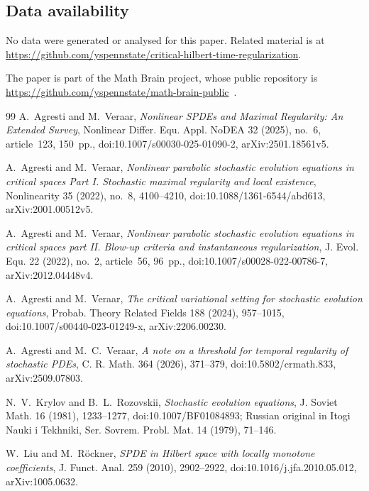 \documentclass[11pt]{amsart}
\theoremstyle{definition}
\theoremstyle{remark}
\numberwithin{equation}{section}
\begin{document}
\begin{samepage}
\section*{Data availability}
No data were generated or analysed for this paper. Related material is at
\url{https://github.com/yspennstate/critical-hilbert-time-regularization}.

The paper is part of the Math Brain project, whose public repository is \url{https://github.com/yspennstate/math-brain-public}~\cite{MathBrainRepo}.
\end{samepage}

\begin{thebibliography}{99}
 A.~Agresti and M.~Veraar,
\emph{Nonlinear SPDEs and Maximal Regularity: An Extended Survey},
Nonlinear Differ. Equ. Appl. NoDEA 32 (2025), no.~6, article~123,
150~pp., doi:10.1007/s00030-025-01090-2, arXiv:2501.18561v5.

 A.~Agresti and M.~Veraar,
\emph{Nonlinear parabolic stochastic evolution equations in critical spaces
Part I. Stochastic maximal regularity and local existence},
Nonlinearity 35 (2022), no.~8, 4100--4210,
doi:10.1088/1361-6544/abd613, arXiv:2001.00512v5.

 A.~Agresti and M.~Veraar,
\emph{Nonlinear parabolic stochastic evolution equations in critical spaces
part II. Blow-up criteria and instantaneous regularization},
J. Evol. Equ. 22 (2022), no.~2, article~56, 96~pp.,
doi:10.1007/s00028-022-00786-7, arXiv:2012.04448v4.

 A.~Agresti and M.~Veraar,
\emph{The critical variational setting for stochastic evolution equations},
Probab. Theory Related Fields 188 (2024), 957--1015,
doi:10.1007/s00440-023-01249-x, arXiv:2206.00230.

 A.~Agresti and M.~C.~Veraar,
\emph{A note on a threshold for temporal regularity of stochastic PDEs},
C. R. Math. 364 (2026), 371--379,
doi:10.5802/crmath.833, arXiv:2509.07803.

 N.~V.~Krylov and B.~L.~Rozovskii,
\emph{Stochastic evolution equations},
J. Soviet Math. 16 (1981), 1233--1277,
doi:10.1007/BF01084893; Russian original in
Itogi Nauki i Tekhniki, Ser. Sovrem. Probl. Mat. 14 (1979), 71--146.

 W.~Liu and M.~R\"ockner,
\emph{SPDE in Hilbert space with locally monotone coefficients},
J. Funct. Anal. 259 (2010), 2902--2922,
doi:10.1016/j.jfa.2010.05.012, arXiv:1005.0632.


\end{thebibliography}
\end{document}
